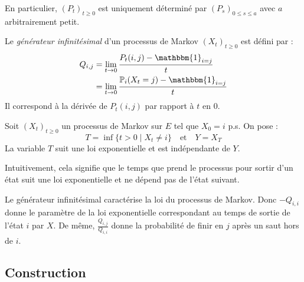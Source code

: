 \begin{prop}
    En particulier, $(P_t)_{t \geqslant 0}$ est uniquement déterminé par $(P_s)_{0 \leqslant s \leqslant a}$ avec 
    $a$ arbitrairement petit. 
\end{prop}

\begin{definition}
    Le \emph{générateur infinitésimal} d'un processus de Markov $(X_t)_{t \geqslant 0}$ est défini par : 
        \begin{align*}
            Q_{i,j} &= \lim_{t \to 0} \frac{P_t(i,j) - \mathbbm{1}_{i = j}}{t} \\ 
            &= \lim_{t \to 0} \frac{ \myP_i(X_t = j) - \mathbbm{1}_{i=j}}{t} 
        \end{align*}
    Il correspond à la dérivée de $P_t(i,j)$ par rapport à $t$ en 0. 
\end{definition}

\begin{lemma}
    Soit $(X_t)_{t \geqslant 0}$ un processus de Markov sur $E$ tel que $X_0 = i$ p.s. On pose : 
        $$ T = \inf \{t > 0 \mid X_t \not = i\} \quad \text{et} \quad Y = X_T $$ 
    La variable $T$ suit une loi exponentielle et est indépendante de $Y$. 
\end{lemma}

Intuitivement, cela signifie que le temps que prend le processus pour sortir d'un état suit une loi exponentielle 
et ne dépend pas de l'état suivant. 

\begin{remark}
    Le générateur infinitésimal caractérise la loi du processus de Markov. Donc $ -Q_{i,i}$ donne le paramètre de la 
    loi exponentielle correspondant au temps de sortie de l'état $i$ par $X$. De même, $\frac{Q_{i,j}}{Q_{i,i}} $ donne 
    la probabilité de finir en $j$ après un saut hors de $i$. 
\end{remark}

\subsection{Construction}

